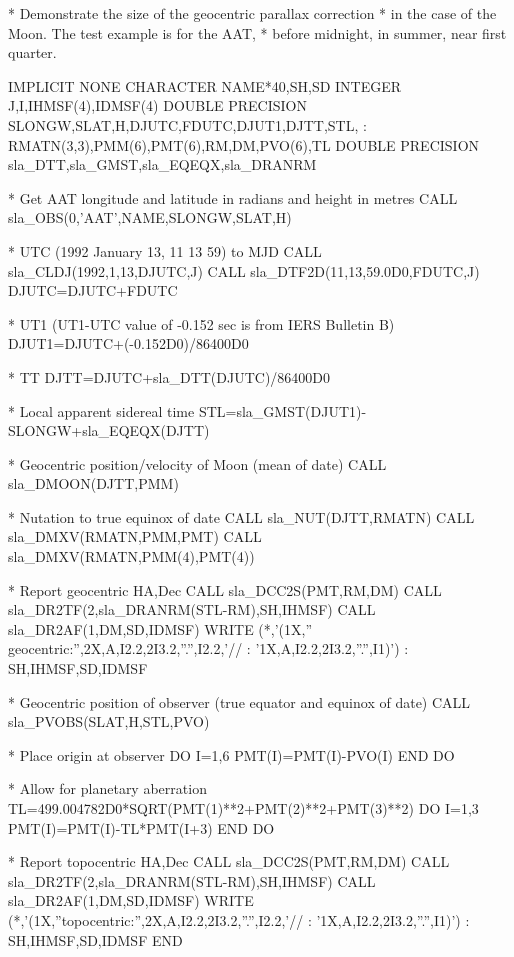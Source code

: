 \documentclass[11pt,twoside,nolof]{starlink}
\begin{document}
\begin{terminalv}
      *  Demonstrate the size of the geocentric parallax correction
      *  in the case of the Moon.  The test example is for the AAT,
      *  before midnight, in summer, near first quarter.

            IMPLICIT NONE
            CHARACTER NAME*40,SH,SD
            INTEGER J,I,IHMSF(4),IDMSF(4)
            DOUBLE PRECISION SLONGW,SLAT,H,DJUTC,FDUTC,DJUT1,DJTT,STL,
           :                 RMATN(3,3),PMM(6),PMT(6),RM,DM,PVO(6),TL
            DOUBLE PRECISION sla_DTT,sla_GMST,sla_EQEQX,sla_DRANRM

      *  Get AAT longitude and latitude in radians and height in metres
            CALL sla_OBS(0,'AAT',NAME,SLONGW,SLAT,H)

      *  UTC (1992 January 13, 11 13 59) to MJD
            CALL sla_CLDJ(1992,1,13,DJUTC,J)
            CALL sla_DTF2D(11,13,59.0D0,FDUTC,J)
            DJUTC=DJUTC+FDUTC

      *  UT1 (UT1-UTC value of -0.152 sec is from IERS Bulletin B)
            DJUT1=DJUTC+(-0.152D0)/86400D0

      *  TT
            DJTT=DJUTC+sla_DTT(DJUTC)/86400D0

      *  Local apparent sidereal time
            STL=sla_GMST(DJUT1)-SLONGW+sla_EQEQX(DJTT)

      *  Geocentric position/velocity of Moon (mean of date)
            CALL sla_DMOON(DJTT,PMM)

      *  Nutation to true equinox of date
            CALL sla_NUT(DJTT,RMATN)
            CALL sla_DMXV(RMATN,PMM,PMT)
            CALL sla_DMXV(RMATN,PMM(4),PMT(4))

      *  Report geocentric HA,Dec
            CALL sla_DCC2S(PMT,RM,DM)
            CALL sla_DR2TF(2,sla_DRANRM(STL-RM),SH,IHMSF)
            CALL sla_DR2AF(1,DM,SD,IDMSF)
            WRITE (*,'(1X,'' geocentric:'',2X,A,I2.2,2I3.2,''.'',I2.2,'//
           :                              '1X,A,I2.2,2I3.2,''.'',I1)')
           :                                                SH,IHMSF,SD,IDMSF

      *  Geocentric position of observer (true equator and equinox of date)
            CALL sla_PVOBS(SLAT,H,STL,PVO)

      *  Place origin at observer
            DO I=1,6
               PMT(I)=PMT(I)-PVO(I)
            END DO

      *  Allow for planetary aberration
            TL=499.004782D0*SQRT(PMT(1)**2+PMT(2)**2+PMT(3)**2)
            DO I=1,3
               PMT(I)=PMT(I)-TL*PMT(I+3)
            END DO

      *  Report topocentric HA,Dec
            CALL sla_DCC2S(PMT,RM,DM)
            CALL sla_DR2TF(2,sla_DRANRM(STL-RM),SH,IHMSF)
            CALL sla_DR2AF(1,DM,SD,IDMSF)
            WRITE (*,'(1X,''topocentric:'',2X,A,I2.2,2I3.2,''.'',I2.2,'//
           :                              '1X,A,I2.2,2I3.2,''.'',I1)')
           :                                                SH,IHMSF,SD,IDMSF
            END
\end{terminalv}
\end{document}
